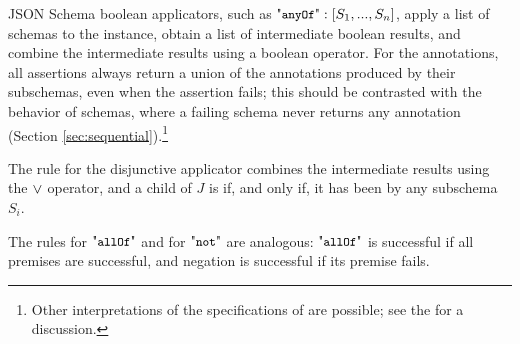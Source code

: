 
JSON Schema boolean applicators, 
such as $\aany:[S_1,...,S_n]$,
apply a list of schemas to the instance, obtain a list of intermediate boolean results,
and combine the intermediate results using a boolean operator.
For the annotations, all assertions always return a union of the annotations
produced by their subschemas, even when the assertion fails;
this should be contrasted with the behavior of schemas, where a failing schema never
returns any annotation (Section \ref{sec:sequential}).\footnote{Other interpretations of
the specifications of {\DTwenty} are possible; see the {\FV} for a discussion.
}

The rule for the disjunctive applicator {\aany} combines the intermediate results using the
$\vee$ operator, and a child of $J$ is {\evaluated} if, and only if, it has been {\evaluated} by any subschema
$S_i$.



The rules for $\aall$ and for $\anot$ are analogous:
$\aall$ is successful if all premises are successful,
and negation is successful if its premise fails.



%
%


